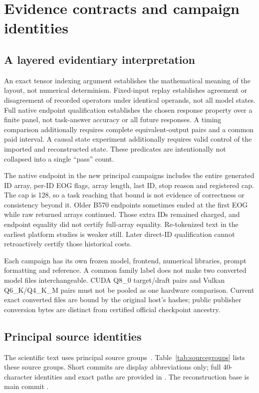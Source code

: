 \section{Evidence contracts and campaign identities}
\label{supp:contracts}
\subsection{A layered evidentiary interpretation}
An exact tensor indexing argument establishes the mathematical meaning of the layout, not numerical determinism. Fixed-input replay establishes agreement or disagreement of recorded operators under identical operands, not all model states. Full native endpoint qualification establishes the chosen response property over a finite panel, not task-answer accuracy or all future responses. A timing comparison additionally requires complete equivalent-output pairs and a common paid interval. A causal state experiment additionally requires valid control of the imported and reconstructed state. These predicates are intentionally not collapsed into a single ``pass'' count.

The native endpoint in the new principal campaigns includes the entire generated ID array, per-ID EOG flags, array length, last ID, stop reason and registered cap. The cap is 128, so a task reaching that bound is not evidence of correctness or consistency beyond it. Older B570 endpoints sometimes ended at the first EOG while raw returned arrays continued. Those extra IDs remained charged, and endpoint equality did not certify full-array equality. Re-tokenized text in the earliest platform studies is weaker still. Later direct-ID qualification cannot retroactively certify those historical costs.

Each campaign has its own frozen model, frontend, numerical libraries, prompt formatting and reference. A common family label does not make two converted model files interchangeable. CUDA Q8\_0 target/draft pairs and Vulkan Q6\_K/Q4\_K\_M pairs must not be pooled as one hardware comparison. Current exact converted files are bound by the original host's hashes; public publisher conversion bytes are distinct from certified official checkpoint ancestry.

\subsection{Principal source identities}
The scientific text uses principal source groups~\cite{rtxconfirm,rtxpostaudit,rtxrepair,bpartition,bfinal,bcost,bpostaudit,bwork}. Table~\ref{tab:sourcegroups} lists these source groups. Short commits are display abbreviations only; full 40-character identities and exact paths are provided in . The reconstruction base is main commit .

